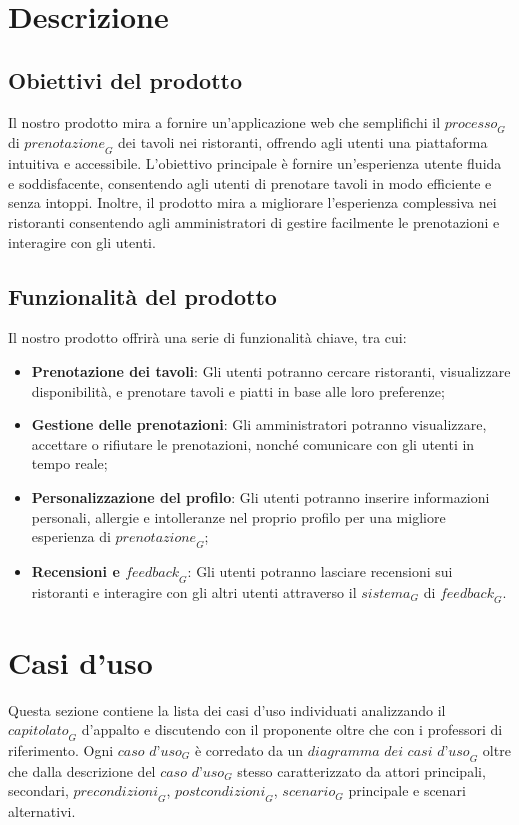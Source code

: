 \documentclass[12pt, oneside]{article}
\begin{document}
\section{Descrizione}
\subsection{Obiettivi del prodotto}
Il nostro prodotto mira a fornire un'applicazione web che semplifichi il $\textit{processo}_G$ di $\textit{prenotazione}_G$ dei tavoli nei ristoranti, offrendo agli utenti una piattaforma intuitiva e accessibile. L'obiettivo principale è fornire un'esperienza utente fluida e soddisfacente, consentendo agli utenti di prenotare tavoli in modo efficiente e senza intoppi. Inoltre, il prodotto mira a migliorare l'esperienza complessiva nei ristoranti consentendo agli amministratori di gestire facilmente le prenotazioni e interagire con gli utenti.

\subsection{Funzionalità del prodotto}
Il nostro prodotto offrirà una serie di funzionalità chiave, tra cui:
\begin{itemize}
\item \textbf{Prenotazione dei tavoli}: Gli utenti potranno cercare ristoranti, visualizzare disponibilità, e prenotare tavoli e piatti in base alle loro preferenze;
\item \textbf{Gestione delle prenotazioni}: Gli amministratori potranno visualizzare, accettare o rifiutare le prenotazioni, nonché comunicare con gli utenti in tempo reale;
\item \textbf{Personalizzazione del profilo}: Gli utenti potranno inserire informazioni personali, allergie e intolleranze nel proprio profilo per una migliore esperienza di $\textit{prenotazione}_G$;
\item \textbf{Recensioni e $\textit{feedback}_G$}: Gli utenti potranno lasciare recensioni sui ristoranti e interagire con gli altri utenti attraverso il $\textit{sistema}_G$ di $\textit{feedback}_G$.
\end{itemize}


\newpage

\section{Casi d'uso}
Questa sezione contiene la lista dei casi d'uso individuati analizzando il $\textit{capitolato}_G$ d'appalto e discutendo con il proponente oltre che con i professori di riferimento. Ogni $\textit{caso d'uso}_G$ è corredato da un $\textit{diagramma dei casi d'uso}_G$ oltre che dalla descrizione del $\textit{caso d'uso}_G$ stesso caratterizzato da attori principali, secondari, $\textit{precondizioni}_G$, $\textit{postcondizioni}_G$, $\textit{scenario}_G$ principale e scenari alternativi.
\end{document}

